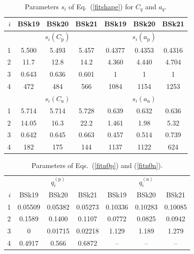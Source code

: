 \documentclass{aa}
\newcommand{\req}[1]{Eq.~(\ref{#1})}
\begin{document}
\begin{table}
\centering
\caption[]{Parameters $s_i$ of \req{fitshape} for $C_q$ and $a_q$.}
\label{tab:fitshape}
\begin{tabular}{r|ccc|ccc}
\hline\hline\rule[-1.4ex]{0pt}{4.3ex}
$i$ &  BSk19 & BSk20 & BSk21 &  BSk19 & BSk20 & BSk21  \\
\hline\rule[-1.4ex]{0pt}{3.7ex}
 & \multicolumn{3}{c|}{$s_i(C_\mathrm{p})$}  & \multicolumn{3}{c}{$s_i(a_\mathrm{p})$} \\
1  & 5.500 & 5.493 & 5.457    & 0.4377 & 0.4353 & 0.4316 \\
2  & 11.7 & 12.8 & 14.2       &  4.360 & 4.440 & 4.704 \\
3  & 0.643 & 0.636 & 0.601    &  1 & 1 & 1 \\
4  & 472  & 484   & 566       & 1084 & 1154 & 1253 \\
\hline\rule[-1.4ex]{0pt}{3.7ex}
 & \multicolumn{3}{c|}{$s_i(C_\mathrm{n})$}  &
\multicolumn{3}{c}{$s_i(a_\mathrm{n})$} \\
1  & 5.714 & 5.714 & 5.728  & 0.639 & 0.632 & 0.636 \\
2  &14.05 & 16.3 & 22.2     & 1.461 & 1.98  & 5.32 \\
3  & 0.642 & 0.645 & 0.663  & 0.457 & 0.514 & 0.739 \\
4  & 182 & 175 & 144        & 1137 & 1122 & 624 \\
\hline\hline
\end{tabular}
\end{table}

\begin{table}
\centering
\caption[]{Parameters of Eqs.~(\ref{fitn0p}) and
(\ref{fitn0n}).}
\label{tab:fitn0q}
\setlength{\tabcolsep}{5pt}
\begin{tabular}{r|ccc|ccc}
\hline\hline\rule[-1.4ex]{0pt}{3.7ex}
 & \multicolumn{3}{c|}{$q^\mathrm{(p)}_i$}  & \multicolumn{3}{c}{$q^\mathrm{(n)}_i$} \\
$i$ &  BSk19 & BSk20 & BSk21 &  BSk19 & BSk20 & BSk21  \\
\hline\rule{0pt}{2.3ex}
1  & 0.05509 & 0.05382 & 0.05273  & 0.10336 & 0.10283 & 0.10085 \\
2  & 0.1589 & 0.1400 & 0.1107 & 0.0772 & 0.0825 & 0.0942 \\
3  &    0 & 0.01715  & 0.02218  & 1.129 & 1.189 & 1.279 \\
4  & 0.4917  & 0.566  & 0.6872   & -- & -- & -- \\
\hline\hline
\end{tabular}
\end{table}
\end{document}
